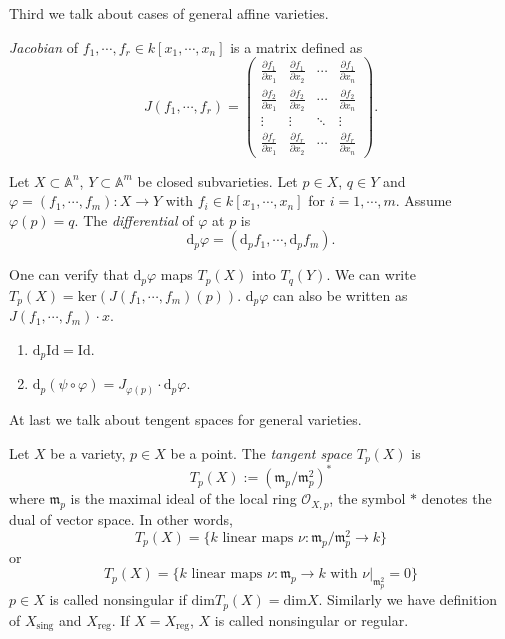 Third we talk about  cases of general affine varieties.
\begin{definition}[Jacobian]
	\textit{Jacobian} of $ f_1,\cdots,f_r\in k[x_1,\cdots,x_n] $ is a matrix defined as
	$$
		J(f_1,\cdots,f_r)=\left(\begin{matrix}
				\frac{\partial f_1}{\partial x_1} & \frac{\partial f_1}{\partial x_2} & \cdots & \frac{\partial f_1}{\partial x_n} \\
				\frac{\partial f_2}{\partial x_1} & \frac{\partial f_2}{\partial x_2} & \cdots & \frac{\partial f_2}{\partial x_n} \\
				\vdots                            & \vdots                            & \ddots & \vdots                            \\
				\frac{\partial f_r}{\partial x_1} & \frac{\partial f_r}{\partial x_2} & \cdots & \frac{\partial f_r}{\partial x_n}
			\end{matrix}\right) .
	$$
\end{definition}
\begin{definition}
	Let $ X\subset \mathbb{A}^n $, $ Y\subset \mathbb{A}^m $ be closed subvarieties. Let $ p\in X $, $ q\in Y $ and $ \varphi = (f_1,\cdots,f_m):X\to Y $ with $ f_i\in k[x_1,\cdots,x_n] $ for $ i=1,\cdots,m $. Assume $ \varphi(p)=q $. The \textit{differential} of $ \varphi $ at $ p $ is
	$$
		\mathrm{d}_p\varphi = (\mathrm{d}_pf_1,\cdots,\mathrm{d}_pf_m).
	$$
\end{definition}
One can verify that $ \mathrm{d}_p\varphi $ maps $ T_p(X) $ into $ T_q(Y) $. We can write $ T_p(X) = \mathrm{ker}(J(f_1,\cdots,f_m)(p)) $. $ \mathrm{d}_p\varphi  $ can also be written as $ J(f_1,\cdots,f_m)\cdot x $.
\begin{proposition}{}
  \noindent
	\begin{enumerate}
		\item $ \mathrm{d}_p\mathrm{Id}=\mathrm{Id} $.
		\item $ \mathrm{d}_p(\psi\circ\varphi)=J_{\varphi(p)} \cdot\mathrm{d}_p\varphi $.
	\end{enumerate}
\end{proposition}

At last we talk about tengent spaces for general varieties.
\begin{definition}
	Let $ X $ be a variety, $ p\in X $ be a point. The \textit{tangent space} $ T_p(X) $ is
	$$
		T_p(X):=(\mathfrak{m}_p/\mathfrak{m}_p^2)^{\ast}
	$$
	where $ \mathfrak{m}_p $ is the maximal ideal of the local ring $ \mathcal{O}_{X,p} $, the symbol $ \ast $ denotes the dual of vector space. In other words,
	$$
		T_p(X)=\lbrace k \text{ linear maps }\nu: \mathfrak{m}_p/\mathfrak{m}_p^2\to k \rbrace
	$$
	or
	$$
		T_p(X)=\lbrace k \text{ linear maps }\nu: \mathfrak{m}_p\to k \text{ with } \nu|_{\mathfrak{m}_p^2}=0  \rbrace
	$$
	$ p\in X $ is called nonsingular if $ \mathrm{dim}T_p(X)=\mathrm{dim}X $. Similarly we have definition of $ X_{\mathrm{sing}} $ and $ X_{\mathrm{reg}}.$ If $ X=X_{\mathrm{reg}} $, $ X $ is called nonsingular or regular.
\end{definition}

